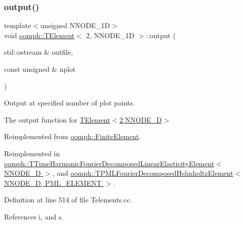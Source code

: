 \mbox{\label{classoomph_1_1TElement_3_012_00_01NNODE__1D_01_4_a5e9bfd033563fd0da6e93b581991827f}} 
\subsubsection{\texorpdfstring{output()}{output()}\hspace{0.1cm}{\footnotesize\ttfamily [2/4]}}
{\footnotesize\ttfamily template$<$unsigned N\+N\+O\+D\+E\+\_\+1D$>$ \\
void \hyperlink{classoomph_1_1TElement}{oomph\+::\+T\+Element}$<$ 2, N\+N\+O\+D\+E\+\_\+1D $>$\+::output (\begin{DoxyParamCaption}\item[{std\+::ostream \&}]{outfile,  }\item[{const unsigned \&}]{nplot }\end{DoxyParamCaption})\hspace{0.3cm}{\ttfamily [virtual]}}



Output at specified number of plot points. 

The output function for \hyperlink{classoomph_1_1TElement_3_012_00_01NNODE__1D_01_4}{T\+Element$<$2,\+N\+N\+O\+D\+E\+\_\+D$>$} 

Reimplemented from \hyperlink{classoomph_1_1FiniteElement_afa9d9b2670f999b43e6679c9dd28c457}{oomph\+::\+Finite\+Element}.



Reimplemented in \hyperlink{classoomph_1_1TTimeHarmonicFourierDecomposedLinearElasticityElement_a8f1141e19dcdd594824d1adc971b2832}{oomph\+::\+T\+Time\+Harmonic\+Fourier\+Decomposed\+Linear\+Elasticity\+Element$<$ N\+N\+O\+D\+E\+\_\+D $>$}, and \hyperlink{classoomph_1_1TPMLFourierDecomposedHelmholtzElement_af0e567c1502be1edd09e7b3378caa1b0}{oomph\+::\+T\+P\+M\+L\+Fourier\+Decomposed\+Helmholtz\+Element$<$ N\+N\+O\+D\+E\+\_\+D, P\+M\+L\+\_\+\+E\+L\+E\+M\+E\+N\+T $>$}.



Definition at line 514 of file Telements.\+cc.



References i, and s.

